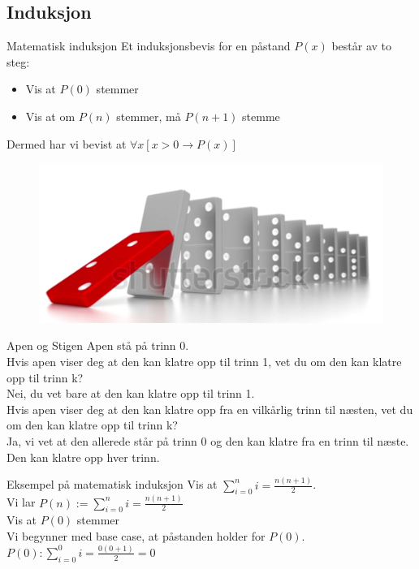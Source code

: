 \subsection{Induksjon}
\begin{frame}{Matematisk induksjon}
    Et induksjonsbevis for en påstand $P(x)$ består av to steg:\\
    \begin{itemize}
        \item Vis at $P(0)$ stemmer
        \item Vis at om $P(n)$ stemmer, må $P(n+1)$ stemme
    \end{itemize}
    Dermed har vi bevist at $\forall x [ x > 0 \rightarrow P(x)]$
    
    \begin{figure}
        \centering
        \includegraphics[scale=0.1]{images/domino.PNG}
        \label{fig:my_label1}
    \end{figure}
\end{frame}

\begin{frame}{Apen og Stigen} %
    Apen stå på trinn 0.\\
    
    Hvis apen viser deg at den kan klatre opp til trinn 1, vet du om den kan klatre opp til trinn k?\\
\pause
    Nei, du vet bare at den kan klatre opp til trinn 1.\\
    
\pause
    Hvis apen viser deg at den kan klatre opp fra en vilkårlig trinn til næsten, vet du om den kan klatre opp til trinn k?\\
\pause
    Ja, vi vet at den allerede står på trinn 0 og den kan klatre fra en trinn til næste. Den kan klatre opp hver trinn.
    
\end{frame}
\begin{frame}{Eksempel på matematisk induksjon}
    Vis at $\sum_{i=0}^{n} i = \frac{n(n+1)}{2}$.\\
\pause    
    Vi lar $P(n) := \sum_{i=0}^{n} i = \frac{n(n+1)}{2}$\\%
    
\pause 
    Vis at $P(0)$ stemmer\\
\pause
    Vi begynner med base case, at påstanden holder for $P(0)$.\\
    $P(0): \sum_{i=0}^{0} i = \frac{0(0+1)}{2} = 0$ \checkmark\\
\end{frame}

